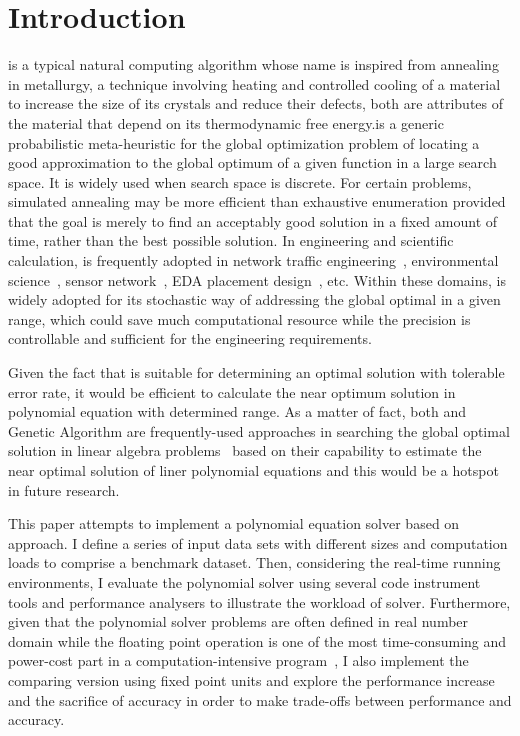 \section{Introduction}
\label{sec:intro}
\SA is a typical natural computing algorithm whose name is inspired from  annealing in metallurgy, a technique involving heating and controlled cooling of a material to increase the size of its crystals and reduce their defects, both are attributes of the material that depend on its thermodynamic free energy.\SA is a generic probabilistic meta-heuristic for the global optimization problem of locating a good approximation to the global optimum of a given function in a large search space. It is widely used when search space is discrete. For certain problems, simulated annealing may be more efficient than exhaustive enumeration provided that the goal is merely to find an acceptably good solution in a fixed amount of time, rather than the best possible solution. In engineering and scientific calculation, \SA is frequently adopted in network traffic engineering~\cite{Pasias:2004}, environmental science~\cite{Jingwen:2009}, sensor network~\cite{Zimmerman:2007}, EDA placement design~\cite{Naifeng:2011}, etc. Within these domains, \SA is widely adopted for its stochastic way of addressing the global optimal in a given range, which could save much computational resource while the precision is controllable and sufficient for the engineering requirements.

Given the fact that \SA is suitable for determining an optimal solution with tolerable error rate, it would be efficient to calculate the near optimum solution in polynomial equation with determined range. As a matter of fact, both \SA and Genetic Algorithm are frequently-used approaches in searching the global optimal solution in linear algebra problems~\cite{Chen:1998} based on their capability to estimate the near optimal solution of liner polynomial equations and this would be a hotspot in future research.

This paper attempts to implement a polynomial equation solver based on \SA approach. I define a series of input data sets with different sizes and computation loads to comprise a benchmark dataset. Then, considering the real-time running environments, I evaluate the \SA polynomial solver using several code instrument tools and performance analysers to illustrate the workload of \SA solver. Furthermore, given that the polynomial solver problems are often defined in real number domain while the floating point operation is one of the most time-consuming and power-cost part in a computation-intensive program~\cite{DaiChen:2013}, I also implement the comparing version using fixed point units and explore the performance increase and the sacrifice of accuracy in order to make trade-offs between performance and accuracy.

